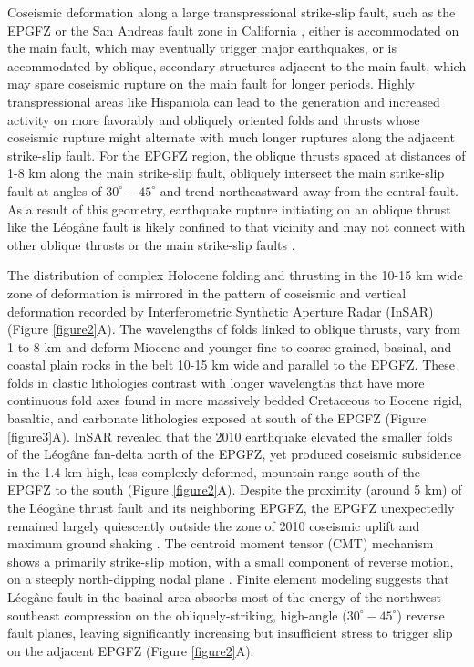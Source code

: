 \documentclass[man,natbib]{apa6}
\begin{document}
Coseismic deformation along a large transpressional strike-slip fault, such as the EPGFZ or the San Andreas fault zone in California \citep{segall1990surface}, either is accommodated on the main fault, which may eventually trigger major earthquakes, or is accommodated by oblique, secondary structures adjacent to the main fault, which may spare coseismic rupture on the main fault for longer periods. Highly transpressional areas like Hispaniola can lead to the generation and increased activity on more favorably and obliquely oriented folds and thrusts whose coseismic rupture might alternate with much longer ruptures along the adjacent strike-slip fault. For the EPGFZ region, the oblique thrusts spaced at distances of 1-8 km along the main strike-slip fault, obliquely intersect the main strike-slip fault at angles of $30^{\circ}-45^{\circ}$ and trend northeastward away from the central fault. As a result of this geometry, earthquake rupture initiating on an oblique thrust like the L\'eog\^ane fault is likely confined to that vicinity and may not connect with other oblique thrusts or the main strike-slip faults \citep{douilly2015three}.

The distribution of complex Holocene folding and thrusting in the 10-15 km wide zone of deformation is mirrored in the pattern of coseismic and vertical deformation recorded by Interferometric Synthetic Aperture Radar (InSAR) \citep{hashimoto2011fan} (Figure \ref{figure2}A). The wavelengths of folds linked to oblique thrusts, vary from 1 to 8 km and deform Miocene and younger fine to coarse-grained, basinal, and coastal plain rocks in the belt 10-15 km wide and parallel to the EPGFZ. These folds in clastic lithologies contrast with longer wavelengths that have more continuous fold axes found in more massively bedded Cretaceous to Eocene rigid, basaltic, and carbonate lithologies exposed at south of the EPGFZ (Figure \ref{figure3}A). InSAR revealed that the 2010 earthquake elevated the smaller folds of the L\'eog\^ane fan-delta north of the EPGFZ, yet produced coseismic subsidence in the 1.4 km-high, less complexly deformed, mountain range south of the EPGFZ to the south \citep{hashimoto2011fan} (Figure \ref{figure2}A). Despite the proximity (around 5 km) of the L\'eog\^ane thrust fault and its neighboring EPGFZ, the EPGFZ unexpectedly remained largely quiescently outside the zone of 2010 coseismic uplift and maximum ground shaking \citep{nettles2010earthquake}. The centroid moment tensor (CMT) mechanism shows a primarily strike-slip motion, with a small component of reverse motion, on a steeply north-dipping nodal plane \citep{nettles2010earthquake,douilly2013crustal}. Finite element modeling \citep{douilly2015three} suggests that L\'eog\^ane fault in the basinal area absorbs most of the energy of the northwest-southeast compression on the obliquely-striking, high-angle ($30^{\circ}-45^{\circ}$) reverse fault planes, leaving significantly increasing but insufficient stress to trigger slip on the adjacent EPGFZ (Figure \ref{figure2}A).
\end{document}
